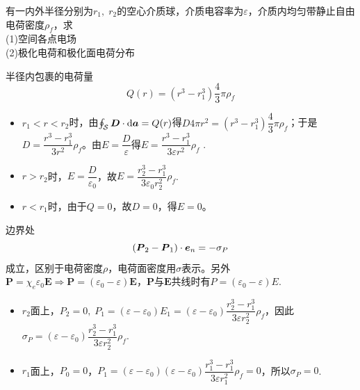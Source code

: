 \documentclass{mynote}
\begin{document}
\begin{exercise}{1.7}
    有一内外半径分别为$r_1, \; r_2$的空心介质球，介质电容率为$\varepsilon$，介质内均匀带静止自由电荷密度$\rho_f$，求\\
    (1)空间各点电场 \\
    (2)极化电荷和极化面电荷分布
\end{exercise}
\begin{solution}
    半径内包裹的电荷量
    \[
    Q(r) = (r^3 - r_1^3) \frac{4}{3} \pi \rho_f    
    \]
    \begin{itemize}
        \item $r_1 < r < r_2$时，由$\oint_{\mathcal{S}} \boldsymbol{D} \cdot \mathop{}\!\mathrm{d} \boldsymbol{a} = Q(r)$得$D 4 \pi r^2 = (r^3 - r_1^3) \dfrac{4}{3} \pi \rho_f$；于是$D = \dfrac{r^3 - r_1^3}{3 r^2} \rho_f$。由$E = \dfrac{D}{\varepsilon}$得$E = \dfrac{r^3 - r_1^3}{3\varepsilon r^2} \rho_f$ .
        \item $r > r_2$时，$E = \dfrac{D}{\varepsilon_0}$，故$E = \dfrac{r_2^3 - r_1^3}{3\varepsilon_0 r_2^2} \rho_f$.
        \item $r < r_1$时，由于$Q =0 $，故$D = 0$，得$E = 0$。
    \end{itemize}
    边界处
    \[
    (\boldsymbol{P}_2 - \boldsymbol{P}_1)\cdot \boldsymbol{e}_n = -\sigma_P    
    \]
    成立，区别于电荷密度$\rho$，电荷面密度用$\sigma$表示。另外$\bm{P} = \chi_e \varepsilon_0 \bm{E} \Rightarrow \bm{P} = (\varepsilon_0 - \varepsilon)\bm{E}$，$\bm{P}$与$\bm{E}$共线时有$P = (\varepsilon_0 - \varepsilon)E$.
    \begin{itemize}
        \item $r_2$面上，$P_2 = 0,\; P_1 = (\varepsilon - \varepsilon_0)E_1 = (\varepsilon - \varepsilon_0)\dfrac{r_2^3 - r_1^3}{3\varepsilon r_2^2} \rho_f$，因此$\sigma_P = (\varepsilon - \varepsilon_0)\dfrac{r_2^3 - r_1^3}{3\varepsilon r_2^2} \rho_f$.
        \item $r_1$面上，$P_0 = 0$，$P_1= (\varepsilon - \varepsilon_0)(\varepsilon - \varepsilon_0)\dfrac{r_1^3 - r_1^3}{3\varepsilon r_1^2} \rho_f = 0$，所以$\sigma_P = 0$.
    \end{itemize}
\end{solution}
\end{document}
